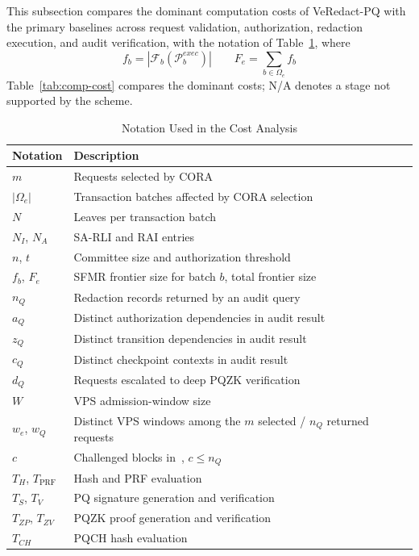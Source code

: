 \documentclass[lettersize,journal]{IEEEtran}
\begin{document}
This subsection compares the dominant computation costs of VeRedact-PQ
with the primary baselines across request validation, authorization,
redaction execution, and audit verification, with the notation of
Table~\ref{tab:cost-notation}, where
\begin{equation}
f_b=|\mathcal{F}_b(\mathcal{P}_b^{exec})|\qquad
F_e=\sum_{b\in\Omega_e}f_b
\end{equation}
Table~\ref{tab:comp-cost} compares the dominant costs; N/A denotes a
stage not supported by the scheme.

\begin{table}[t]
\centering
\caption{Notation Used in the Cost Analysis}
\label{tab:cost-notation}
\scriptsize
\renewcommand{\arraystretch}{1.08}
\setlength{\tabcolsep}{3pt}
\begin{tabular}{ll}
\hline
\textbf{Notation} & \textbf{Description} \\
\hline
$m$ & Requests selected by CORA \\
$|\Omega_e|$ & Transaction batches affected by CORA selection \\
$N$ & Leaves per transaction batch \\
$N_I$, $N_A$ & SA-RLI and RAI entries \\
$n$, $t$ & Committee size and authorization threshold \\
$f_b$, $F_e$ & SFMR frontier size for batch $b$, total frontier size \\
$n_Q$ & Redaction records returned by an audit query \\
$a_Q$ & Distinct authorization dependencies in audit result \\
$z_Q$ & Distinct transition dependencies in audit result \\
$c_Q$ & Distinct checkpoint contexts in audit result \\
$d_Q$ & Requests escalated to deep PQZK verification \\
$W$ & VPS admission-window size \\
$w_e$, $w_Q$ & Distinct VPS windows among the $m$ selected / $n_Q$ returned requests \\
$c$ & Challenged blocks in~\cite{ref13}, $c\le n_Q$ \\
\hline
$T_H$, $T_{\mathrm{PRF}}$ & Hash and PRF evaluation \\
$T_S$, $T_V$ & PQ signature generation and verification \\
$T_{ZP}$, $T_{ZV}$ & PQZK proof generation and verification \\
$T_{CH}$ & PQCH hash evaluation \\

\end{tabular}
\end{table}
\end{document}

